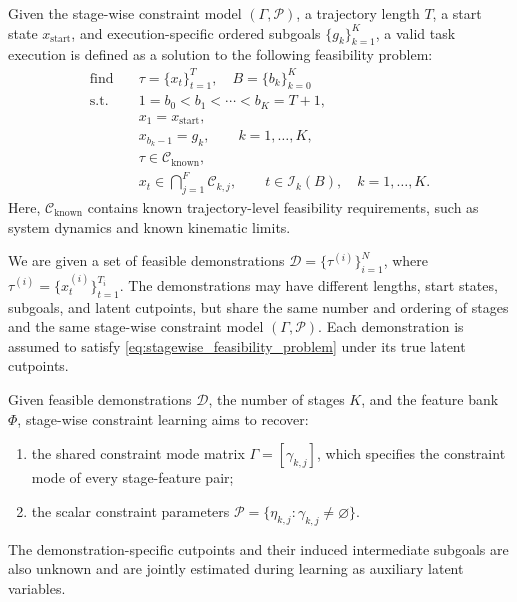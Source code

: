 Given the stage-wise constraint model $(\Gamma,\mathcal{P})$, a trajectory length $T$, a start state $x_{\mathrm{start}}$, and execution-specific ordered subgoals $\{g_k\}_{k=1}^{K}$, a valid task execution is defined as a solution to the following feasibility problem:
\begin{equation}
\begin{aligned}
\text{find}\quad
& \tau=\{x_t\}_{t=1}^{T},\quad B=\{b_k\}_{k=0}^{K} \\
\text{s.t.}\quad
& 1=b_0<b_1<\cdots<b_K=T+1,\\
& x_1=x_{\mathrm{start}},\\
& x_{b_k-1}=g_k,
\qquad k=1,\dots,K,\\
& \tau\in\mathcal{C}_{\mathrm{known}},\\
& x_t\in\bigcap_{j=1}^{F}\mathcal{C}_{k,j},
\qquad
t\in\mathcal{I}_k(B),\quad k=1,\dots,K.
\end{aligned}
\label{eq:stagewise_feasibility_problem}
\end{equation}
Here, $\mathcal{C}_{\mathrm{known}}$ contains known trajectory-level feasibility requirements, such as system dynamics and known kinematic limits.

We are given a set of feasible demonstrations $\mathcal{D}=\{\tau^{(i)}\}_{i=1}^{N}$, where $\tau^{(i)}=\{x_t^{(i)}\}_{t=1}^{T_i}$. The demonstrations may have different lengths, start states, subgoals, and latent cutpoints, but share the same number and ordering of stages and the same stage-wise constraint model $(\Gamma,\mathcal{P})$. Each demonstration is assumed to satisfy \eqref{eq:stagewise_feasibility_problem} under its true latent cutpoints.

\begin{definition}
Given feasible demonstrations $\mathcal{D}$, the number of stages $K$, and the feature bank $\Phi$, stage-wise constraint learning aims to recover:
\begin{enumerate}
    \item the shared constraint mode matrix $\Gamma=[\gamma_{k,j}]$, which specifies the constraint mode of every stage-feature pair;
    \item the scalar constraint parameters $\mathcal{P}=\{\eta_{k,j}:\gamma_{k,j}\neq\varnothing\}$.
\end{enumerate}
The demonstration-specific cutpoints and their induced intermediate subgoals are also unknown and are jointly estimated during learning as auxiliary latent variables.
\end{definition}

